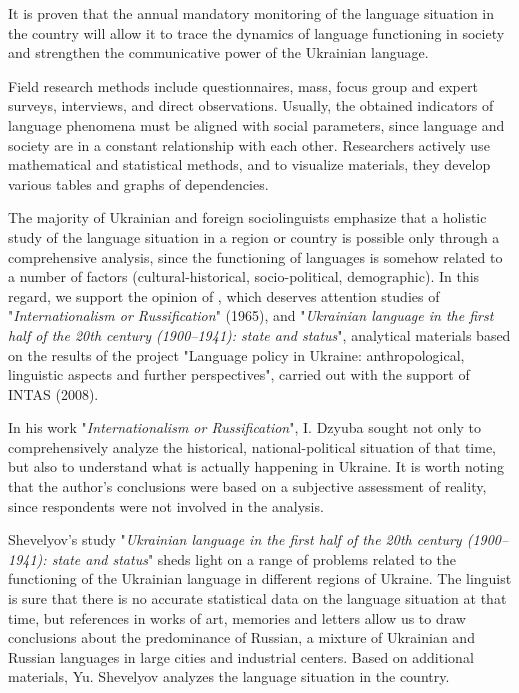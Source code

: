 \documentclass[english]{textolivre}
\begin{document}
It is proven that the annual mandatory monitoring of the language situation in the country will allow it to trace the dynamics of language functioning in society and strengthen the communicative power of the Ukrainian language.

Field research methods include questionnaires, mass, focus group and expert surveys, interviews, and direct observations. Usually, the obtained indicators of language phenomena must be aligned with social parameters, since language and society are in a constant relationship with each other. Researchers actively use mathematical and statistical methods, and to visualize materials, they develop various tables and graphs of dependencies.

The majority of Ukrainian and foreign sociolinguists emphasize that a holistic study of the language situation in a region or country is possible only through a comprehensive analysis, since the functioning of languages is somehow related to a number of factors (cultural-historical, socio-political, demographic). In this regard, we support the opinion of \textcite{danylevska2019ukrainian}, which deserves attention studies of \textcite{dzyuba2005} "\emph{Internationalism or Russification}" (1965), and \textcite{shevelyov} "\emph{Ukrainian language in the first half of the 20th century (1900–1941): state and status}", analytical materials based on the results of the project "Language policy in Ukraine: anthropological, linguistic aspects and further perspectives", carried out with the support of INTAS (2008).

In his work "\emph{Internationalism or Russification}", I. Dzyuba sought not only to comprehensively analyze the historical, national-political situation of that time, but also to understand what is actually happening in Ukraine. It is worth noting that the author's conclusions were based on a subjective assessment of reality, since respondents were not involved in the analysis.

Shevelyov's study "\emph{Ukrainian language in the first half of the 20th century (1900–1941): state and status}" sheds light on a range of problems related to the functioning of the Ukrainian language in different regions of Ukraine. The linguist is sure that there is no accurate statistical data on the language situation at that time, but references in works of art, memories and letters allow us to draw conclusions about the predominance of Russian, a mixture of Ukrainian and Russian languages in large cities and industrial centers. Based on additional materials, Yu. Shevelyov analyzes the language situation in the country.
\end{document}
